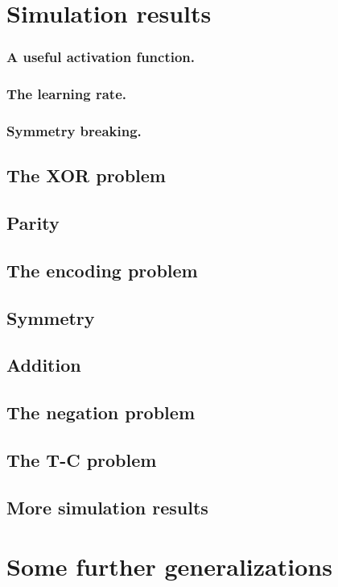 \documentclass[10pt,letterpaper]{article}
\begin{document}
	\section{Simulation results}
	
	\subsubsection{A useful activation function.}
	\subsubsection{The learning rate.}
	\subsubsection{Symmetry breaking.}
	
	\subsection{The XOR problem}
	\subsection{Parity}
	\subsection{The encoding problem}
	\subsection{Symmetry}
	\subsection{Addition}
	\subsection{The negation problem}
	\subsection{The T-C problem}
	\subsection{More simulation results}
	
	\section{Some further generalizations}
\end{document}
